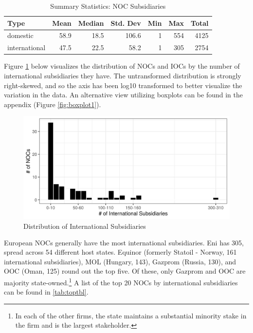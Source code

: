 \documentclass[11pt,]{book}
\begin{document}
\begin{table}

\caption{\label{tab:sumstats}Summary Statistics: NOC Subsidiaries}
\centering
\begin{tabular}[t]{lrrrrrr}
\toprule
\textbf{Type} & \textbf{Mean} & \textbf{Median} & \textbf{Std. Dev} & \textbf{Min} & \textbf{Max} & \textbf{Total}\\
\midrule
domestic & 58.9 & 18.5 & 106.6 & 1 & 554 & 4125\\
international & 47.5 & 22.5 & 58.2 & 1 & 305 & 2754\\
\bottomrule
\end{tabular}
\end{table}

Figure \ref{fig:distributions} below visualizes the distribution of NOCs and IOCs by the number of international subsidiaries they have. The untransformed distribution is strongly right-skewed, and so the axis has been log10 transformed to better visualize the variation in the data. An alternative view utilizing boxplots can be found in the appendix (Figure \ref{fig:boxplot1}).

\begin{figure}

{\centering \includegraphics[width=0.8\linewidth]{paper1fig/distributions-1} 

}

\caption{Distribution of International Subsidiaries}\label{fig:distributions}
\end{figure}

European NOCs generally have the most international subsidiaries. Eni has 305, spread across 54 different host states. Equinor (formerly Statoil - Norway, 161 international subsidiaries), MOL (Hungary, 143), Gazprom (Russia, 130), and OOC (Oman, 125) round out the top five. Of these, only Gazprom and OOC are majority state-owned.\footnote{In each of the other firms, the state maintains a substantial minority stake in the firm and is the largest stakeholder.} A list of the top 20 NOCs by international subsidiaries can be found in \ref{tab:toptbl}.
\end{document}

